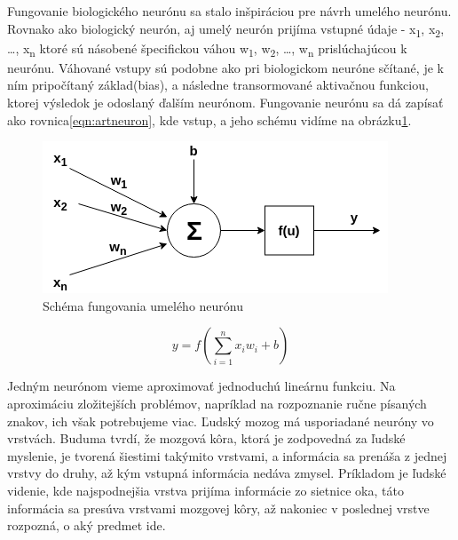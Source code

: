 \indent Fungovanie biologického neurónu sa stalo inšpiráciou pre návrh umelého neurónu.
Rovnako ako biologický neurón, aj umelý neurón prijíma vstupné údaje - x\textsubscript{1},  x\textsubscript{2}, \dots,  x\textsubscript{n} ktoré sú násobené špecifickou váhou w\textsubscript{1},  w\textsubscript{2}, \dots,  w\textsubscript{n} prislúchajúcou k neurónu.
Váhované vstupy sú podobne ako pri biologickom neuróne sčítané, je k ním pripočítaný
základ(bias), a následne transormované aktivačnou funkciou, ktorej výsledok je odoslaný ďalším neurónom. Fungovanie neurónu sa dá zapísať ako rovnica\eqref{eqn:artneuron}, kde vstup, a jeho schému vidíme na obrázku\ref{fig:artneuron}.

\begin{figure}[H]
	\centering
	\includegraphics[width=0.7\linewidth]{img/artneuron}
	\caption{Schéma fungovania umelého neurónu}
	\label{fig:artneuron}
\end{figure}

\begin{equation}\label{eqn:artneuron}
y = f(\sum\limits_{i=1}^n x_{i}w_{i} + b)
\end{equation}

\indent Jedným neurónom vieme aproximovať jednoduchú lineárnu funkciu.
Na aproximáciu zložitejších problémov, napríklad na rozpoznanie ručne písaných znakov, ich však potrebujeme viac.
Ľudský mozog má usporiadané neuróny vo vrstvách.
Buduma tvrdí, že mozgová kôra, ktorá je zodpovedná za ľudské myslenie, je tvorená šiestimi takýmito vrstvami\cite{buduma2017fundamentals}, a informácia sa prenáša z jednej vrstvy do druhy, až kým vstupná informácia nedáva zmysel.
Príkladom je ľudské videnie, kde najspodnejšia vrstva prijíma informácie zo sietnice oka, táto informácia sa presúva vrstvami mozgovej kôry, až nakoniec v poslednej vrstve rozpozná, o aký predmet ide.\\

